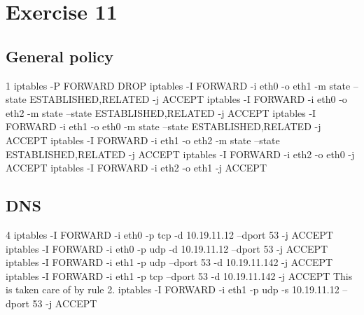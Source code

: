 \documentclass[12pt]{article}
\begin{document}
\section*{Exercise 11}

\subsection*{General policy}
1\newline
iptables -P FORWARD DROP\newline
iptables -I FORWARD -i eth0 -o eth1 -m state --state ESTABLISHED,RELATED -j ACCEPT\newline
iptables -I FORWARD -i eth0 -o eth2 -m state --state ESTABLISHED,RELATED -j ACCEPT\newline
{}\newline
iptables -I FORWARD -i eth1 -o eth0 -m state --state ESTABLISHED,RELATED -j ACCEPT\newline
iptables -I FORWARD -i eth1 -o eth2 -m state --state ESTABLISHED,RELATED -j ACCEPT\newline
{}\newline
iptables -I FORWARD -i eth2 -o eth0 -j ACCEPT\newline
iptables -I FORWARD -i eth2 -o eth1 -j ACCEPT\newline

\subsection*{DNS}
4\newline
iptables -I FORWARD -i eth0 -p tcp -d 10.19.11.12 --dport 53 -j ACCEPT\newline
iptables -I FORWARD -i eth0 -p udp -d 10.19.11.12 --dport 53 -j ACCEPT\newline
{}\newline
iptables -I FORWARD -i eth1 -p udp --dport 53 -d 10.19.11.142 -j ACCEPT\newline
iptables -I FORWARD -i eth1 -p tcp --dport 53 -d 10.19.11.142 -j ACCEPT\newline
{}\newline
This is taken care of by rule 2.\newline
iptables -I FORWARD -i eth1 -p udp -s 10.19.11.12 --dport 53 -j ACCEPT\newline
\end{document}
